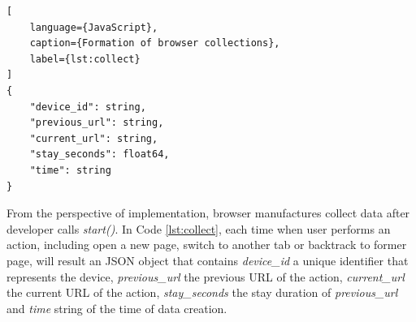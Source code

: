 \begin{lstlisting}[
    language={JavaScript},
    caption={Formation of browser collections},
    label={lst:collect}
]
{
    "device_id": string,
    "previous_url": string,
    "current_url": string,
    "stay_seconds": float64,
    "time": string
}
\end{lstlisting}

From the perspective of implementation, browser manufactures collect data after developer
calls \emph{start()}.
In Code \ref{lst:collect}, each time when user performs an action, including open a new page,
switch to another tab or backtrack to former page, will result an JSON object that contains
\emph{device\_id} a unique identifier that represents the device, \emph{previous\_url} the previous
URL of the action, \emph{current\_url} the current URL of the action, \emph{stay\_seconds}
the stay duration of \emph{previous\_url} and \emph{time} string of the time of data creation.


\cleardoublepage
